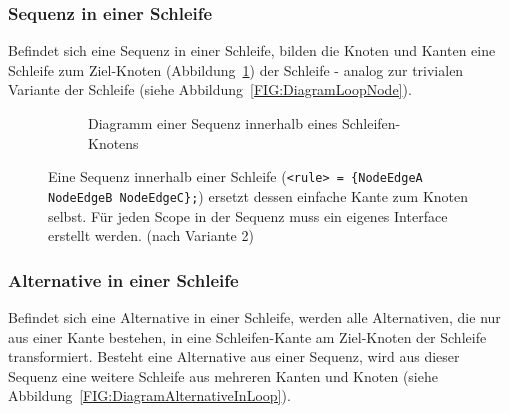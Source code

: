\documentclass[../InterneDSLs.tex]{subfiles}
\begin{document}
\subsubsection{Sequenz in einer Schleife}
Befindet sich eine Sequenz in einer Schleife, bilden die Knoten und Kanten eine Schleife zum Ziel-Knoten (Abbildung~\ref{FIG:DiagramSequenceInLoop}) der Schleife - analog zur trivialen Variante der Schleife (siehe Abbildung~\ref{FIG:DiagramLoopNode}).
\begin{figure}[ht]
\centering
  \begin{subfigure}[c]{0.49\textwidth}
    \caption{Diagramm einer Sequenz innerhalb eines Schleifen-Knotens}
    \label{FIG:DiagramSequenceInLoop}
  \end{subfigure}
  \begin{subfigure}[c]{0.49\textwidth}
    
  \end{subfigure}
  \caption[Abbildung einer Sequenz innerhalb einer Schleife]{Eine Sequenz innerhalb einer Schleife (\texttt{<rule> = \{NodeEdgeA NodeEdgeB NodeEdgeC\};}) ersetzt dessen einfache Kante zum Knoten selbst. Für jeden Scope in der Sequenz muss ein eigenes Interface erstellt werden. (nach Variante 2)}
  \label{FIG:SequenceInLoop}
\end{figure}

\subsubsection{Alternative in einer Schleife}
Befindet sich eine Alternative in einer Schleife, werden alle Alternativen, die nur aus einer Kante bestehen, in eine Schleifen-Kante am Ziel-Knoten der Schleife transformiert. Besteht eine Alternative aus einer Sequenz, wird aus dieser Sequenz eine weitere Schleife aus mehreren Kanten und Knoten (siehe Abbildung~\ref{FIG:DiagramAlternativeInLoop}).
\end{document}
